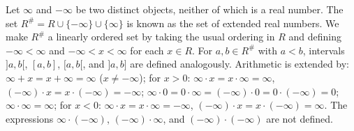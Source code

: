 Let $\infty$ and $-\infty$ be two distinct objects, neither of which is a real number. The set $R^{\#} = R \cup \{-\infty\} \cup \{\infty\}$ is known as the set of extended real numbers. We make $R^{\#}$ a linearly ordered set by taking the usual ordering in $R$ and defining $-\infty < \infty$ and $-\infty < x < \infty$ for each $x \in R$. For $a, b \in R^{\#}$ with $a < b$, intervals $]a,b[$, $[a,b]$, $[a,b[$, and $]a,b]$ are defined analogously. Arithmetic is extended by: $\infty + x = x + \infty = \infty$ ($x \neq -\infty$); for $x > 0$: $\infty \cdot x = x \cdot \infty = \infty$, $(-\infty) \cdot x = x \cdot (-\infty) = -\infty$; $\infty \cdot 0 = 0 \cdot \infty = (-\infty) \cdot 0 = 0 \cdot (-\infty) = 0$; $\infty \cdot \infty = \infty$; for $x < 0$: $\infty \cdot x = x \cdot \infty = -\infty$, $(-\infty) \cdot x = x \cdot (-\infty) = \infty$. The expressions $\infty \cdot (-\infty)$, $(-\infty) \cdot \infty$, and $(-\infty) \cdot (-\infty)$ are not defined.